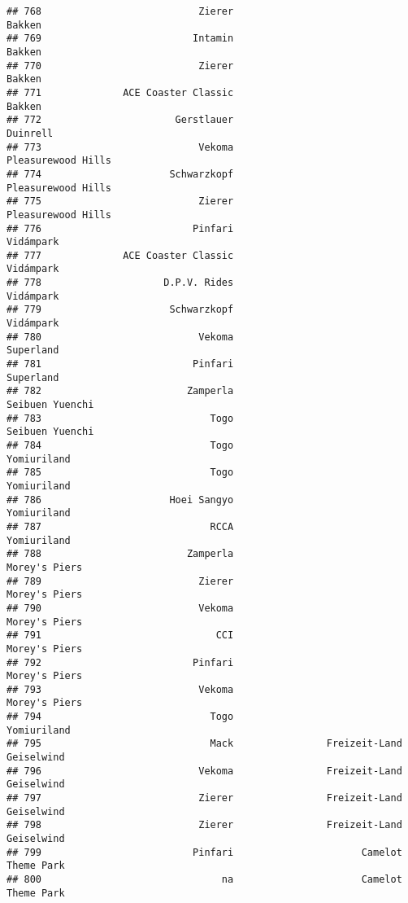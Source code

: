 \documentclass[
]{article}
\begin{document}
\begin{verbatim}
## 768                           Zierer                                  Bakken
## 769                          Intamin                                  Bakken
## 770                           Zierer                                  Bakken
## 771              ACE Coaster Classic                                  Bakken
## 772                       Gerstlauer                                Duinrell
## 773                           Vekoma                      Pleasurewood Hills
## 774                      Schwarzkopf                      Pleasurewood Hills
## 775                           Zierer                      Pleasurewood Hills
## 776                          Pinfari                               Vidámpark
## 777              ACE Coaster Classic                               Vidámpark
## 778                     D.P.V. Rides                               Vidámpark
## 779                      Schwarzkopf                               Vidámpark
## 780                           Vekoma                               Superland
## 781                          Pinfari                               Superland
## 782                         Zamperla                         Seibuen Yuenchi
## 783                             Togo                         Seibuen Yuenchi
## 784                             Togo                             Yomiuriland
## 785                             Togo                             Yomiuriland
## 786                      Hoei Sangyo                             Yomiuriland
## 787                             RCCA                             Yomiuriland
## 788                         Zamperla                           Morey's Piers
## 789                           Zierer                           Morey's Piers
## 790                           Vekoma                           Morey's Piers
## 791                              CCI                           Morey's Piers
## 792                          Pinfari                           Morey's Piers
## 793                           Vekoma                           Morey's Piers
## 794                             Togo                             Yomiuriland
## 795                             Mack                Freizeit-Land Geiselwind
## 796                           Vekoma                Freizeit-Land Geiselwind
## 797                           Zierer                Freizeit-Land Geiselwind
## 798                           Zierer                Freizeit-Land Geiselwind
## 799                          Pinfari                      Camelot Theme Park
## 800                               na                      Camelot Theme Park

\end{verbatim}
\end{document}

